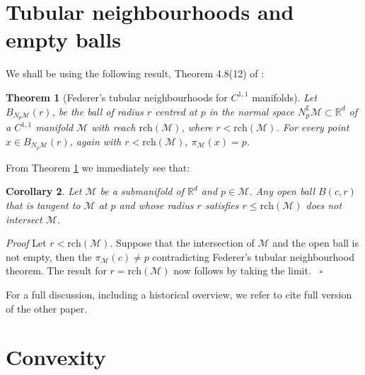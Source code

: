 \documentclass{article}
\newenvironment{proof}[1][{}]{%
  \begin{trivlist}\item[]\textit{Proof #1}\quad}%
  {\hfill\hspace*{\fill}~$\square$\end{trivlist}}
\newtheorem{theorem}{Theorem}[section]
\newtheorem{corollary}[theorem]{Corollary}
\newcommand{\M}{\mathcal{M}}
\newcommand{\rch}{\mathrm{rch}}
\begin{document}
\section{Tubular neighbourhoods and empty balls} 
We shall be using the following result, Theorem 4.8(12) of \cite{federer1959}:
\begin{theorem}[Federer's tubular neighbourhoods for $C^{1,1}$ manifolds] \label{Theorem:TubularNeighbourhood}
Let $B_{N_p\M} (r)$, be the ball of radius $r$ centred at $p$ in the normal space $N_p^{\mathbb{E}}\M\subset \mathbb{R}^d$ of a $C^{1,1}$ manifold $\M$ with reach $\rch ( \M)$, where $r< \rch (\M)$. For every point $x \in B_{N_p\M} (r)$, again with $r< \rch (\M)$, $\pi_{\M}(x)=p$.
\end{theorem}

From Theorem \ref{Theorem:TubularNeighbourhood} we immediately see that: 
\begin{corollary}
\label{lem:medialball}
Let $\M$ be a submanifold of $\mathbb{R}^d$ and $p\in \M$. Any open ball $B(c,r)$ that is tangent to $\M$ at $p$ and whose radius $r$ satisfies $r\leq \rch (\M)$ does not intersect $\M$.
\end{corollary}
\begin{proof} Let $r < \rch (\M)$.
Suppose that the intersection of $\M$ and the open ball is not empty, then the $\pi_{\M}(c)\neq p$ contradicting Federer's tubular neighbourhood theorem. The result for $r=  \rch (\M)$ now follows by taking the limit.
\end{proof}

For a full discussion, including a historical overview, we refer to {\color{red} cite full version of the other paper}. 















\section{Convexity}
\end{document}
